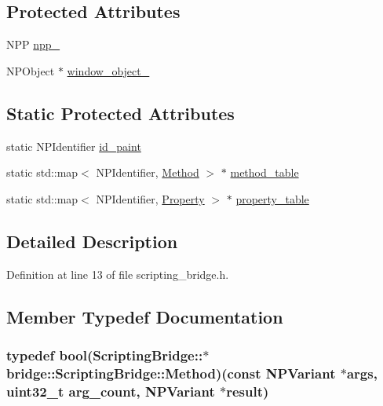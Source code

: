 \subsection*{Protected Attributes}
\begin{DoxyCompactItemize}
\item 
NPP \hyperlink{classbridge_1_1_scripting_bridge_a122d088702ccb290a91a0cb1c507fbbe}{npp\_\-}
\item 
NPObject $\ast$ \hyperlink{classbridge_1_1_scripting_bridge_a59bc10d2500b138998dc973aee38039e}{window\_\-object\_\-}
\end{DoxyCompactItemize}
\subsection*{Static Protected Attributes}
\begin{DoxyCompactItemize}
\item 
static NPIdentifier \hyperlink{classbridge_1_1_scripting_bridge_af9fe1c1d57b6fb113b2e0da63128807d}{id\_\-paint}
\item 
static std::map$<$ NPIdentifier, \hyperlink{classbridge_1_1_scripting_bridge_aa2d60d52b4e91aa7659850b73f393727}{Method} $>$ $\ast$ \hyperlink{classbridge_1_1_scripting_bridge_a1057c4c6b923babcbc62a5732d2c3235}{method\_\-table}
\item 
static std::map$<$ NPIdentifier, \hyperlink{classbridge_1_1_scripting_bridge_a9063ac1ad0b4e1a439e954e7a505057d}{Property} $>$ $\ast$ \hyperlink{classbridge_1_1_scripting_bridge_a84c8336a6ba799945dfe31358d389a62}{property\_\-table}
\end{DoxyCompactItemize}


\subsection{Detailed Description}


Definition at line 13 of file scripting\_\-bridge.h.



\subsection{Member Typedef Documentation}
\hypertarget{classbridge_1_1_scripting_bridge_aa2d60d52b4e91aa7659850b73f393727}{
\subsubsection[{Method}]{\setlength{\rightskip}{0pt plus 5cm}typedef bool(ScriptingBridge::$\ast$ {\bf bridge::ScriptingBridge::Method})(const NPVariant $\ast$args, uint32\_\-t arg\_\-count, NPVariant $\ast$result)}}
\label{classbridge_1_1_scripting_bridge_aa2d60d52b4e91aa7659850b73f393727}


